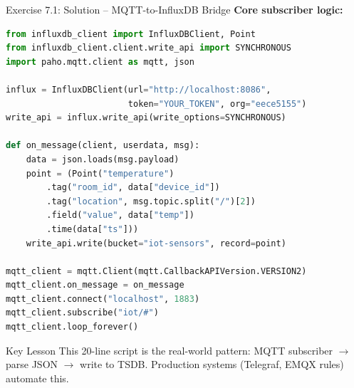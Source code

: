 \documentclass[aspectratio=169,11pt]{beamer}
\begin{document}
\begin{frame}[fragile]{Exercise 7.1: Solution -- MQTT-to-InfluxDB Bridge}
    \textbf{Core subscriber logic:}

    \vspace{0.1cm}
\begin{lstlisting}[language=Python]
from influxdb_client import InfluxDBClient, Point
from influxdb_client.client.write_api import SYNCHRONOUS
import paho.mqtt.client as mqtt, json

influx = InfluxDBClient(url="http://localhost:8086",
                        token="YOUR_TOKEN", org="eece5155")
write_api = influx.write_api(write_options=SYNCHRONOUS)

def on_message(client, userdata, msg):
    data = json.loads(msg.payload)
    point = (Point("temperature")
        .tag("room_id", data["device_id"])
        .tag("location", msg.topic.split("/")[2])
        .field("value", data["temp"])
        .time(data["ts"]))
    write_api.write(bucket="iot-sensors", record=point)

mqtt_client = mqtt.Client(mqtt.CallbackAPIVersion.VERSION2)
mqtt_client.on_message = on_message
mqtt_client.connect("localhost", 1883)
mqtt_client.subscribe("iot/#")
mqtt_client.loop_forever()
\end{lstlisting}

    \begin{exampleblock}{Key Lesson}
        This 20-line script is the real-world pattern: MQTT subscriber $\rightarrow$ parse JSON $\rightarrow$ write to TSDB. Production systems (Telegraf, EMQX rules) automate this.
    \end{exampleblock}
\end{frame}
\end{document}
